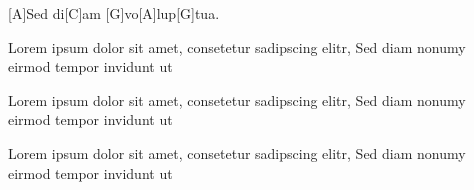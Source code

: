 \begin{guitar}
	\begin{highlightbar}
		 
		[A]Sed di[C]am [G]vo[A]lup[G]tua.
	\end{highlightbar}\hfill%
	\pagebreak
{}
	 
	Lorem ipsum dolor sit amet, consetetur sadipscing elitr, 
	Sed diam nonumy eirmod tempor invidunt ut
	
	 
	Lorem ipsum dolor sit amet, consetetur sadipscing elitr, 
	Sed diam nonumy eirmod tempor invidunt ut
	
	 
	Lorem ipsum dolor sit amet, consetetur sadipscing elitr, 
	Sed diam nonumy eirmod tempor invidunt ut
	
	
\end{guitar}